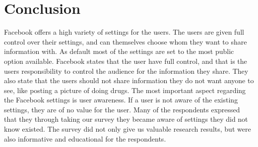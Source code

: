 \chapter{Conclusion}
\label{chp:conclusion} 

Facebook offers a high variety of settings for the users. The users are given full control over their settings, and can themselves choose whom they want to share information with. As default most of the settings are set to the most public option available. Facebook states that the user have full control, and that is the users responsibility to control the audience for the information they share. They also state that the users should not share information they do not want anyone to see, like posting a picture of doing drugs. The most important aspect regarding the Facebook settings is user awareness. If a user is not aware of the existing settings, they are of no value for the user. Many of the respondents expressed that they through taking our survey they became aware of settings they did not know existed. The survey did not only give us valuable research results, but were also informative and educational for the respondents.  

